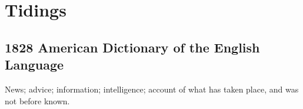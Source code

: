 \section{Tidings}
	\label{TIDINGS}
	

\subsection{1828 American Dictionary of the English Language} %
	\label{TIDINGS-1828}

	\begin{compactitem}
		\item News; advice; information; intelligence; account of what has taken place, and was not before known.
	\end{compactitem}




	
	
